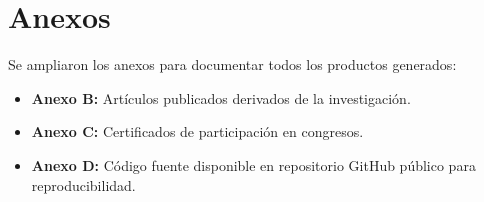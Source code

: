 \documentclass[12pt,letterpaper]{article}
\begin{document}
\section{Anexos}

Se ampliaron los anexos para documentar todos los productos generados:

\begin{itemize}[leftmargin=*, itemsep=0.3em]
    \item \textbf{Anexo B:} Artículos publicados derivados de la investigación.
    \item \textbf{Anexo C:} Certificados de participación en congresos.
    \item \textbf{Anexo D:} Código fuente disponible en repositorio GitHub público para reproducibilidad.
\end{itemize}
\end{document}
